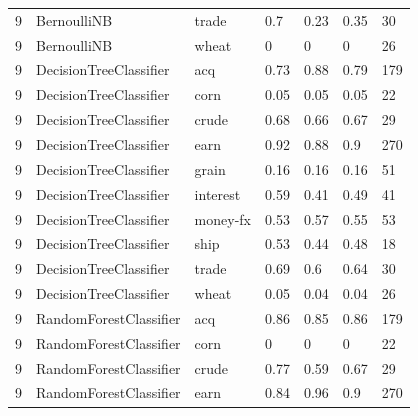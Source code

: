 \documentclass{article}
\begin{document}
\begin{table}[H]
\begin{tabular}{lllllll}
9             & BernoulliNB            & trade           & 0.7                & 0.23            & 0.35              & 30               \\
9             & BernoulliNB            & wheat           & 0                  & 0               & 0                 & 26               \\
9             & DecisionTreeClassifier & acq             & 0.73               & 0.88            & 0.79              & 179              \\
9             & DecisionTreeClassifier & corn            & 0.05               & 0.05            & 0.05              & 22               \\
9             & DecisionTreeClassifier & crude           & 0.68               & 0.66            & 0.67              & 29               \\
9             & DecisionTreeClassifier & earn            & 0.92               & 0.88            & 0.9               & 270              \\
9             & DecisionTreeClassifier & grain           & 0.16               & 0.16            & 0.16              & 51               \\
9             & DecisionTreeClassifier & interest        & 0.59               & 0.41            & 0.49              & 41               \\
9             & DecisionTreeClassifier & money-fx        & 0.53               & 0.57            & 0.55              & 53               \\
9             & DecisionTreeClassifier & ship            & 0.53               & 0.44            & 0.48              & 18               \\
9             & DecisionTreeClassifier & trade           & 0.69               & 0.6             & 0.64              & 30               \\
9             & DecisionTreeClassifier & wheat           & 0.05               & 0.04            & 0.04              & 26               \\
9             & RandomForestClassifier & acq             & 0.86               & 0.85            & 0.86              & 179              \\
9             & RandomForestClassifier & corn            & 0                  & 0               & 0                 & 22               \\
9             & RandomForestClassifier & crude           & 0.77               & 0.59            & 0.67              & 29               \\
9             & RandomForestClassifier & earn            & 0.84               & 0.96            & 0.9               & 270              \\\end{tabular}
\end{table}
\end{document}
